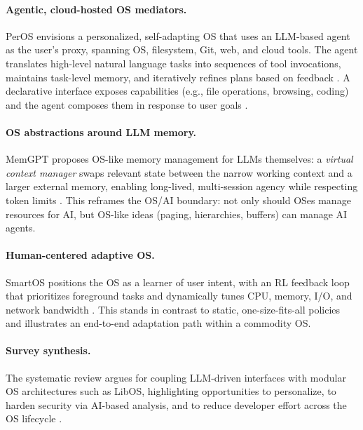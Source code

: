 \documentclass{article}
\begin{document}
\paragraph{Agentic, cloud-hosted OS mediators.}
PerOS envisions a personalized, self-adapting OS that uses an LLM-based agent as the user's proxy, spanning OS, filesystem, Git, web, and cloud tools. The agent translates high-level natural language tasks into sequences of tool invocations, maintains task-level memory, and iteratively refines plans based on feedback \cite{he2024peros}. %
A declarative interface exposes capabilities (e.g., file operations, browsing, coding) and the agent composes them in response to user goals \cite{he2024peros}. %

\paragraph{OS abstractions around LLM memory.}
MemGPT proposes OS-like memory management for LLMs themselves: a \emph{virtual context manager} swaps relevant state between the narrow working context and a larger external memory, enabling long-lived, multi-session agency while respecting token limits \cite{packer2023memgpt}. %
This reframes the OS/AI boundary: not only should OSes manage resources for AI, but OS-like ideas (paging, hierarchies, buffers) can manage AI agents.

\paragraph{Human-centered adaptive OS.}
SmartOS positions the OS as a learner of user intent, with an RL feedback loop that prioritizes foreground tasks and dynamically tunes CPU, memory, I/O, and network bandwidth \cite{goodarzy2021smartos}. This stands in contrast to static, one-size-fits-all policies and illustrates an end-to-end adaptation path within a commodity OS.

\paragraph{Survey synthesis.}
The systematic review argues for coupling LLM-driven interfaces with modular OS architectures such as LibOS, highlighting opportunities to personalize, to harden security via AI-based analysis, and to reduce developer effort across the OS lifecycle \cite{zhang2024systematic}. %
\end{document}
